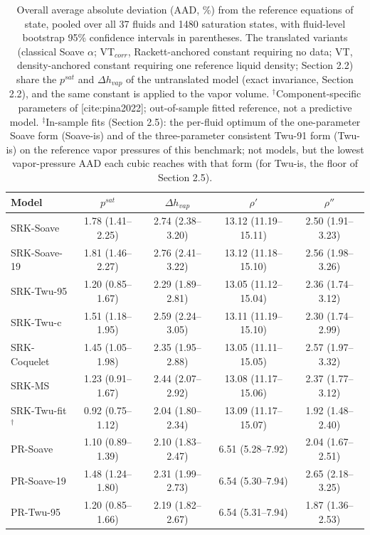 \begin{table}[H]
\centering
\caption{Overall average absolute deviation (AAD, \%) from the reference equations of state, pooled over all 37 fluids and 1480 saturation states, with fluid-level bootstrap 95\% confidence intervals in parentheses. The translated variants (classical Soave $\alpha$; VT$_{corr}$, Rackett-anchored constant requiring no data; VT, density-anchored constant requiring one reference liquid density; Section 2.2) share the $p^{sat}$ and $\Delta h_{vap}$ of the untranslated model (exact invariance, Section 2.2), and the same constant is applied to the vapor volume. $^{\dagger}$Component-specific parameters of [cite:pina2022]; out-of-sample fitted reference, not a predictive model. $^{\ddagger}$In-sample fits (Section 2.5): the per-fluid optimum of the one-parameter Soave form (Soave-is) and of the three-parameter consistent Twu-91 form (Twu-is) on the reference vapor pressures of this benchmark; not models, but the lowest vapor-pressure AAD each cubic reaches with that form (for Twu-is, the floor of Section 2.5).}
\label{tab:tab_overall}
\small
\begin{tabular}{lcccc}
\toprule
Model & $p^{sat}$ & $\Delta h_{vap}$ & $\rho'$ & $\rho''$ \\
\midrule
SRK-Soave & 1.78 (1.41--2.25) & 2.74 (2.38--3.20) & 13.12 (11.19--15.11) & 2.50 (1.91--3.23) \\
SRK-Soave-19 & 1.81 (1.46--2.27) & 2.76 (2.41--3.22) & 13.12 (11.18--15.10) & 2.56 (1.98--3.26) \\
SRK-Twu-95 & 1.20 (0.85--1.67) & 2.29 (1.89--2.81) & 13.05 (11.12--15.04) & 2.36 (1.74--3.12) \\
SRK-Twu-c & 1.51 (1.18--1.95) & 2.59 (2.24--3.05) & 13.11 (11.19--15.10) & 2.30 (1.74--2.99) \\
SRK-Coquelet & 1.45 (1.05--1.98) & 2.35 (1.95--2.88) & 13.05 (11.11--15.05) & 2.57 (1.97--3.32) \\
SRK-MS & 1.23 (0.91--1.67) & 2.44 (2.07--2.92) & 13.08 (11.17--15.06) & 2.37 (1.77--3.12) \\
SRK-Twu-fit$^{\dagger}$ & 0.92 (0.75--1.12) & 2.04 (1.80--2.34) & 13.09 (11.17--15.07) & 1.92 (1.48--2.40) \\
PR-Soave & 1.10 (0.89--1.39) & 2.10 (1.83--2.47) & 6.51 (5.28--7.92) & 2.04 (1.67--2.51) \\
PR-Soave-19 & 1.48 (1.24--1.80) & 2.31 (1.99--2.73) & 6.54 (5.30--7.94) & 2.65 (2.18--3.25) \\
PR-Twu-95 & 1.20 (0.85--1.66) & 2.19 (1.82--2.67) & 6.54 (5.31--7.94) & 1.87 (1.36--2.53) \\

\end{tabular}
\end{table}
